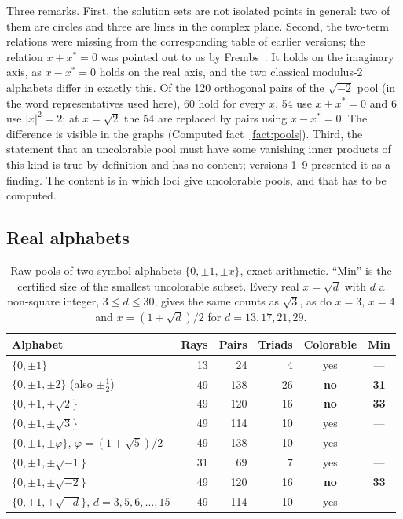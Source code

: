 Three remarks.  First, the solution sets are not isolated points in general: two of them are
circles and three are lines in the complex plane.  Second, the two-term relations were missing
from the corresponding table of earlier versions; the relation $x+x^{*}=0$ was pointed out to us
by Frembs~\cite{Frembs2026}.  It holds on the imaginary axis, as $x-x^{*}=0$ holds on the real
axis, and the two classical modulus-2 alphabets differ in exactly this.  Of the 120 orthogonal
pairs of the $\sqrt{-2}$ pool (in the word representatives used here), 60 hold for every $x$, 54
use $x+x^{*}=0$ and 6 use $|x|^2=2$; at $x=\sqrt2$ the 54 are replaced by pairs using
$x-x^{*}=0$.  The difference is visible in the graphs (Computed fact~\ref{fact:pools}).  Third, the statement that an
uncolorable pool must have some vanishing inner products of this kind is true by definition and
has no content; versions 1--9 presented it as a finding.  The content is in which loci give
uncolorable pools, and that has to be computed.

\subsection{Real alphabets}

\begin{table}[t]
\centering
\caption{Raw pools of two-symbol alphabets $\{0,\pm1,\pm x\}$, exact arithmetic.  ``Min'' is the
certified size of the smallest uncolorable subset.  Every real $x=\sqrt d$ with $d$ a non-square
integer, $3\le d\le30$, gives the same counts as $\sqrt3$, as do $x=3$, $x=4$ and
$x=(1+\sqrt d)/2$ for $d=13,17,21,29$.}
\label{tab:alphabets}
\begin{tabular}{lrrrcc}
\toprule
Alphabet & Rays & Pairs & Triads & Colorable & Min \\
\midrule
$\{0,\pm1\}$ & 13 & 24 & 4 & yes & --- \\
$\{0,\pm1,\pm2\}$ (also $\pm\tfrac12$) & 49 & 138 & 26 & \textbf{no} & \textbf{31} \\
$\{0,\pm1,\pm\sqrt2\}$ & 49 & 120 & 16 & \textbf{no} & \textbf{33} \\
$\{0,\pm1,\pm\sqrt3\}$ & 49 & 114 & 10 & yes & --- \\
$\{0,\pm1,\pm\varphi\}$, $\varphi=(1+\sqrt5)/2$ & 49 & 138 & 10 & yes & --- \\
\midrule
$\{0,\pm1,\pm\sqrt{-1}\}$ & 31 & 69 & 7 & yes & --- \\
$\{0,\pm1,\pm\sqrt{-2}\}$ & 49 & 120 & 16 & \textbf{no} & \textbf{33} \\
$\{0,\pm1,\pm\sqrt{-d}\}$, $d=3,5,6,\dots,15$ & 49 & 114 & 10 & yes & --- \\
\bottomrule
\end{tabular}
\end{table}

